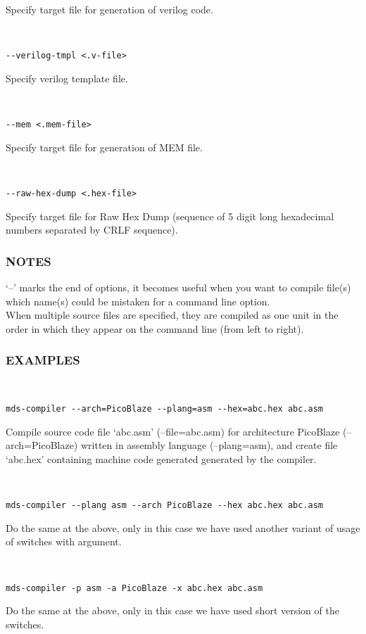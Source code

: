            Specify target file for generation of verilog code.
             {
            ~\\
            \usecodefont

            \verb'--verilog-tmpl <.v-file>'\\
            }
            Specify verilog template file.
             {
            ~\\
            \usecodefont

            \verb'--mem <.mem-file>'\\
            }
            Specify target file for generation of MEM file.
             {
            ~\\
            \usecodefont

            \verb'--raw-hex-dump <.hex-file>'\\
            }
            Specify target file for Raw Hex Dump (sequence of 5 digit long hexadecimal numbers separated by CRLF sequence).\\

        \subsubsection{NOTES}
            `--' marks the end of options, it becomes useful when you want to compile file(s) which name(s) could be mistaken for a command line option.\\

            When multiple source files are specified, they are compiled as one unit in the order in which they appear on the command line (from left to right).
        \subsubsection{EXAMPLES}
            {
            ~\\
            \usecodefont

            \verb'mds-compiler --arch=PicoBlaze --plang=asm --hex=abc.hex abc.asm'\\
            }
            Compile source code file `abc.asm' (--file=abc.asm) for architecture PicoBlaze (--arch=PicoBlaze) written in assembly language (--plang=asm), and create file `abc.hex' containing machine code generated generated by the compiler.
             {
            ~\\
            \usecodefont

            \verb'mds-compiler --plang asm --arch PicoBlaze --hex abc.hex abc.asm'\\
            }
            Do the same at the above, only in this case we have used another variant of usage of switches with argument.
             {
            ~\\
            \usecodefont

            \verb'mds-compiler -p asm -a PicoBlaze -x abc.hex abc.asm'\\
            }
            Do the same at the above, only in this case we have used short version of the switches.\\


